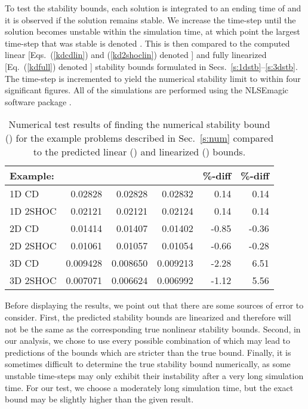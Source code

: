 \documentclass{article}
\begin{document}
{To test the stability bounds, each solution is integrated to an ending time of  and it is observed if the solution remains stable.  We increase the time-step  until the solution becomes unstable within the  simulation time, at which point the largest time-step that was stable is denoted .  This is then compared to the computed linear [Eqs.~(\ref{kdcdlin}) and (\ref{kd2shoclin}) denoted ] and fully linearized [Eq.~(\ref{kdfull}) denoted ] stability bounds formulated in Secs.~\ref{s:1dstb}--\ref{s:3dstb}.  The time-step is incremented to yield the numerical stability limit to within four significant figures.  All of the simulations are performed using the NLSEmagic software package \cite{NLSEMAGIC}.
  
\begin{table}[p]
\begin{center}
\begin{tabular}{|l|r|r|r|r|r|} \hline
Example: &  &  &  & \%-diff  & \%-diff  \\
\hline
1D CD    & 0.02828  & 0.02828  & 0.02832  &  0.14 &  0.14 \\
1D 2SHOC & 0.02121  & 0.02121  & 0.02124  &  0.14 &  0.14 \\
2D CD    & 0.01414  & 0.01407  & 0.01402  & -0.85 & -0.36 \\
2D 2SHOC & 0.01061  & 0.01057  & 0.01054  & -0.66 & -0.28 \\
3D CD    & 0.009428 & 0.008650 & 0.009213 & -2.28 &  6.51 \\
3D 2SHOC & 0.007071 & 0.006624 & 0.006992 & -1.12 &  5.56 \\
\hline
\end{tabular}
\caption{Numerical test results of finding the numerical stability bound () for the example problems described in Sec.~\ref{s:num} compared to the predicted linear () and linearized () bounds.\label{t:results}}
\end{center}
\end{table}


Before displaying the results, we point out that there are some sources of error to consider.  First, the predicted stability bounds are linearized and therefore will not be the same as the corresponding true nonlinear stability bounds.  Second, in our analysis, we chose to use every possible combination of  which may lead to predictions of the bounds which are stricter than the true bound.  Finally, it is sometimes difficult to determine the true stability bound numerically, as some unstable time-steps may only exhibit their instability after a very long simulation time.  For our test, we choose a moderately long simulation time, but the exact bound may be slightly higher than the given result. 

}
\end{document}
